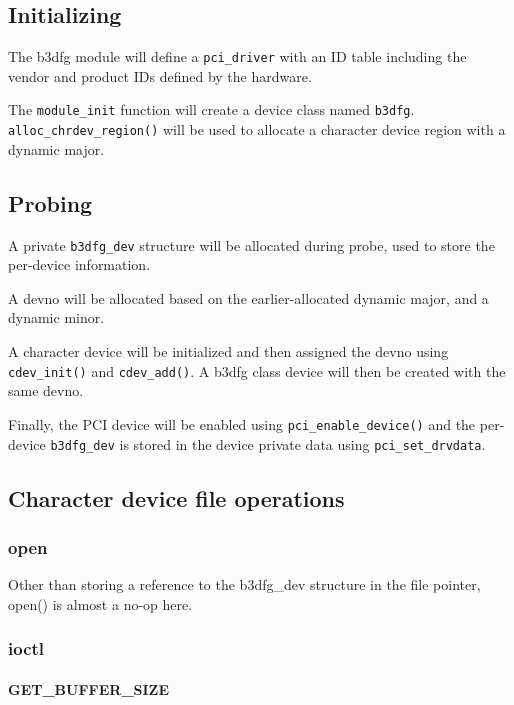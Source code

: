 \documentclass[12pt]{article}
\begin{document}
\subsection{Initializing}

The b3dfg module will define a \texttt{pci\_driver} with an ID table including the vendor and product IDs defined by the hardware.

The \texttt{module\_init} function will create a device class named \texttt{b3dfg}. \texttt{alloc\_chrdev\_region()} will be used to allocate a character device region with a dynamic major.

\subsection{Probing}

A private \texttt{b3dfg\_dev} structure will be allocated during probe, used to store the per-device information.

A devno will be allocated based on the earlier-allocated dynamic major, and a dynamic minor.

A character device will be initialized and then assigned the devno using \texttt{cdev\_init()} and \texttt{cdev\_add()}. A b3dfg class device will then be created with the same devno.

Finally, the PCI device will be enabled using \texttt{pci\_enable\_device()} and the per-device \texttt{b3dfg\_dev} is stored in the device private data using \texttt{pci\_set\_drvdata}.

\subsection{Character device file operations}

\subsubsection{open}

Other than storing a reference to the b3dfg\_dev structure in the file pointer, open() is almost a no-op here.

\subsubsection{ioctl}

\paragraph{GET\_BUFFER\_SIZE}
\end{document}

